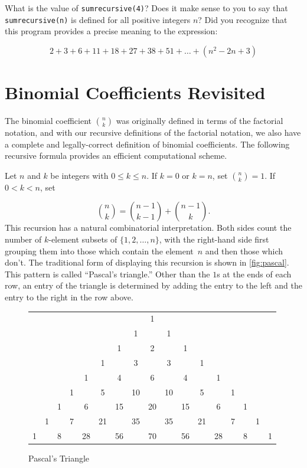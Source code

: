 \medskip
What is the value of \texttt{sumrecursive(4)}?  Does it make
sense to you to say that \texttt{sumrecursive(n)} is defined
for all positive integers $n$?  Did you recognize that this
program provides a precise meaning to the expression:

\[
2+3+6+11+18+27+38+51+\dots +(n^2-2n+3)
\]

\section{Binomial Coefficients Revisited}\label{s:induction:bincoeffs}
The binomial coefficient $\binom{n}{k}$ was originally defined in
terms of the factorial notation, and with our recursive definitions of
the factorial notation, we also have a complete and legally-correct
definition of binomial coefficients. The following recursive formula
provides an efficient computational scheme.

Let $n$ and $k$ be integers with $0\le k\le n$. If $k=0$ or $k=n$, set
$\binom{n}{k}=1$.  If $0<k<n$, set

\[
\binom{n}{k}=\binom{n-1}{k-1}+\binom{n-1}{k}.
\]
This recursion has a natural combinatorial interpretation.  Both sides
count the number of $k$-element subsets of $\{1,2,\dots,n\}$, with the
right-hand side first grouping them into those which contain the
element~$n$ and then those which don't.  The traditional form of
displaying this recursion is shown in \autoref{fig:pascal}.  This
pattern is called ``Pascal's triangle.'' Other than the $1$s at the
ends of each row, an entry of the triangle is determined by adding the
entry to the left and the entry to the right in the row above.

\begin{figure}
\begin{center}
\begin{tabular}{ccccccccccccccccc}
& &   &   &   &   &   &   &  1&   &   &   &   &   &   &   &  \\
& &   &   &   &   &   &  1&   &  1&   &   &   &   &   &   &  \\
& &   &   &   &   &  1&   &  2&   &  1&   &   &   &   &   &  \\
&  &   &   &   &  1&   &  3&   &  3&   &  1&   &   &   &   &  \\
&  &   &   &  1&   &  4&   &  6&   &  4&   &  1&   &   &   &  \\
&  &   &  1&   &  5&   & 10&   & 10&   &  5&   &  1&   &   &  \\
&  &  1&   &  6&   & 15&   & 20&   & 15&   &  6&   &  1&   &  \\
& 1&   &  7&   & 21&   & 35&   & 35&   & 21&   &  7&   &  1& \\
1& & 8  &  & 28  & &  56 & &  70 & & 56  & & 28  &  & 8  &  &1
\end{tabular}
\caption{Pascal's Triangle\label{fig:pascal}}
\end{center}
\end{figure}

